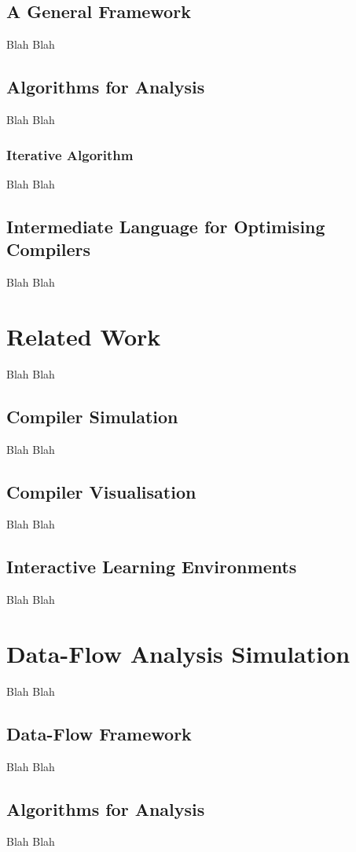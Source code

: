 \documentclass[bsc,twoside,singlespacing,parskip,logo,notimes,normalheadings]{infthesis}
\begin{document}
	\section{A General Framework}
	Blah Blah
    
    \section{Algorithms for Analysis}
    Blah Blah

	\subsection{Iterative Algorithm}
	Blah Blah

    \section{Intermediate Language for Optimising Compilers}
    Blah Blah


\chapter{Related Work}
Blah Blah

	\section{Compiler Simulation}
	Blah Blah

	\section{Compiler Visualisation}
	Blah Blah

	\section{Interactive Learning Environments}
	Blah Blah


\chapter{Data-Flow Analysis Simulation}
Blah Blah

	\section{Data-Flow Framework}
	Blah Blah

        \section{Algorithms for Analysis}
	Blah Blah
\end{document}
